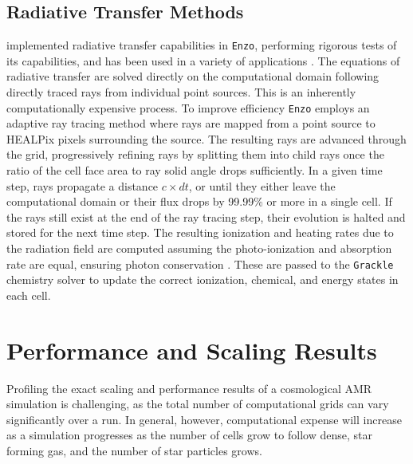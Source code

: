 \documentclass[12pt]{article} %
\begin{document}
\subsection{Radiative Transfer Methods}

\cite{WiseAbel2011} implemented radiative transfer capabilities in \texttt{Enzo}, performing rigorous tests of its capabilities, and has been used in a variety of applications \citep[e.g.][]{Wise2012a,WiseAbel2012,Wise2014, Smith2015, OShea2015, Koh2016, Regan2016a, Regan2016b}. The equations of radiative transfer are solved directly on the computational domain following directly traced rays from individual point sources. This is an inherently computationally expensive process. To improve efficiency \texttt{Enzo} employs an adaptive ray tracing method \citep{AbelWandelt2002} where rays are mapped from a point source to HEALPix pixels surrounding the source. The resulting rays are advanced through the grid, progressively refining rays by splitting them into child rays once the ratio of the cell face area to ray solid angle drops sufficiently. In a given time step, rays propagate a distance $c\times dt$, or until they either leave the computational domain or their flux drops by 99.99\% or more in a single cell. If the rays still exist at the end of the ray tracing step, their evolution is halted and stored for the next time step. The resulting ionization and heating rates due to the radiation field are computed assuming the photo-ionization and absorption rate are equal, ensuring photon conservation \citep{Abel1999, Mellema2006}. These are passed to the \texttt{Grackle} chemistry solver to update the correct ionization, chemical, and energy states in each cell.

\section{Performance and Scaling Results}

Profiling the exact scaling and performance results of a cosmological AMR simulation is challenging, as the total number of computational grids can vary significantly over a run. In general, however, computational expense will increase as a simulation progresses as the number of cells grow to follow dense, star forming gas, and the number of star particles grows. 

\def\bibfont{\footnotesize}

\end{document}

